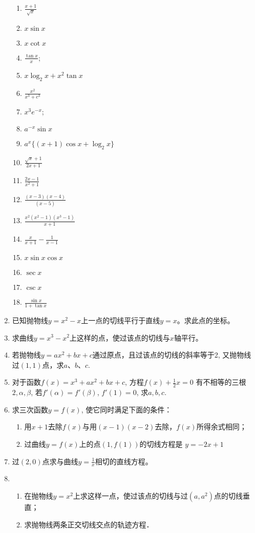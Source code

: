 \begin{ex}
\begin{enumerate}
\begin{multicols}{2}
\begin{enumerate}
    \item $\frac{x+1}{\sqrt{x}}$
    \item  $x \sin x$
    \item $x \cot  x$
    \item  $\frac{\tan  x}{x}$;
    \item  $x \log _{2} x+x^{2} \tan  x$
    \item  $\frac{x^{2}}{x^{3}+c^{3}}$
    \item  $x^{3} e^{-x}$;
    \item  $a^{-x} \sin x$ 
    \item $a^{x}\{(x+1) \cos x+\log_2 x\}$
    \item $\frac{\sqrt{x}+1}{2 x+1}$ 
    \item $\frac{2 x-1}{x^{2}+1}$
    \item $\frac{(x-3)(x-4)}{(x-5)}$
    \item  $\frac{x^{2}\left(x^{2}-1\right)\left(x^{3}-1\right)}{x+1}$
    \item  $\frac{x}{x+1}-\frac{1}{x-1}$
    \item  $x \sin x \cos x$
    \item $\sec x $ 
    \item $\csc x$
    \item $\frac{\sin x}{1+\tan  x}$
\end{enumerate}
\end{multicols}

\item 已知抛物线$y=x^2-x$上一点的切线平行于直线$y=x$。求此点的坐标。
\item 求曲线$y=x^3-x^2$上这样的点，使过该点的切线与$x$轴平行。
\item 若抛物线$y=ax^2+bx+c$通过原点，且过该点的切线的斜率等于2, 又抛物线过$(1, 1)$点，求$a$、$b$、$c$.
\item 对于函数$f(x)=x^3+ax^2+bx+c$, 方程$f(x)+\frac{1}{2}x=0$
有不相等的三根$2,\alpha,\beta$, 若$f'(\alpha)=f'(\beta)$, $f'(1)=0$, 求$a,b,c$.
\item 求三次函数$y=f(x)$, 使它同时满足下面的条件：
\begin{enumerate}
    \item 用$x+1$去除$f(x)$与用$(x-1)(x-2)$去除，$f(x)$所得余式相同；
    \item 过曲线$y=f(x)$上的点$(1,f(1))$的切线方程是
$y=-2x+1$
\end{enumerate}
\item 
过$(2, 0)$点求与曲线$y=\frac{1}{x}$相切的直线方程。
\item 
\begin{enumerate}
\item 在抛物线$y=x^2$上求这样一点，使过该点的切线与过$(a,a^2)$点的切线垂直；
\item 求抛物线两条正交切线交点的轨迹方程．
\end{enumerate}


\end{enumerate}
\end{ex}

